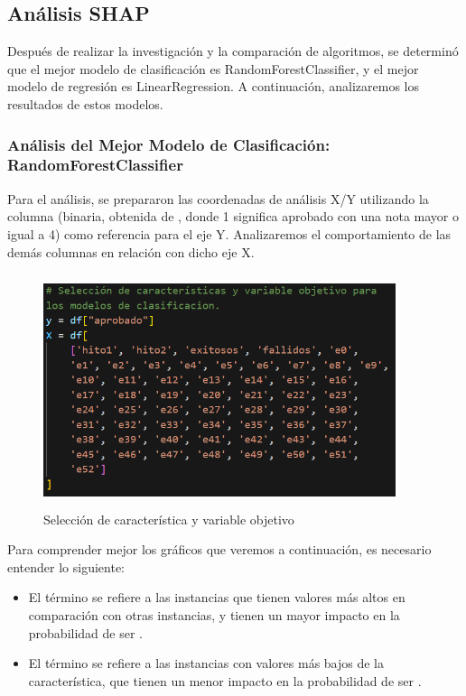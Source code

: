 \subsection{Análisis SHAP}

Después de realizar la investigación y la comparación de algoritmos, se determinó que el mejor modelo de clasificación es RandomForestClassifier, y el mejor modelo de regresión es LinearRegression. A continuación, analizaremos los resultados de estos modelos.

\subsubsection{Análisis del Mejor Modelo de Clasificación: RandomForestClassifier}


Para el análisis, se prepararon las coordenadas de análisis X/Y utilizando la columna  (binaria, obtenida de , donde 1 significa aprobado con una nota mayor o igual a 4) como referencia para el eje Y. Analizaremos el comportamiento de las demás columnas en relación con dicho eje X.

\begin{figure}[H]
    \centering
    \includegraphics[width=4.061in,height=2.686in]{img/shap_rf/conjunto_clasificacion.png}
    \caption{Selección de característica y variable objetivo}
    \label{fig:variables_entrenamiento}
\end{figure}

Para comprender mejor los gráficos que veremos a continuación, es necesario entender lo siguiente:

\begin{itemize}
    \item El término  se refiere a las instancias que tienen valores más altos en comparación con otras instancias, y tienen un mayor impacto en la probabilidad de ser .
    \item El término  se refiere a las instancias con valores más bajos de la característica, que tienen un menor impacto en la probabilidad de ser .
\end{itemize}

